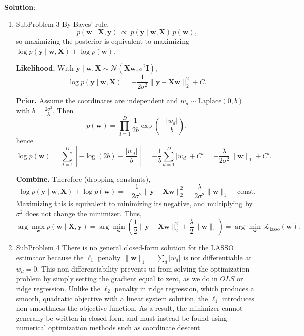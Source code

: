 \documentclass[submit]{harvardml}
\newenvironment{solution}{
    \vspace{2mm}
    \color{blue}\noindent\textbf{Solution}:
}{}
\begin{document}
\begin{solution}
\begin{enumerate}
Rearrange:

\[
(\mathbf X^\top \mathbf X + \lambda \mathbf I)\mathbf w
=
\mathbf X^\top \mathbf y.
\]

Assuming $(\mathbf X^\top \mathbf X + \lambda \mathbf I)$ is invertible, we obtain

\[
\boxed{
\mathbf w_{\text{ridge}}
=
(\mathbf X^\top \mathbf X + \lambda \mathbf I)^{-1}
\mathbf X^\top \mathbf y.
}
\]

\item SubProblem 3 
By Bayes' rule,
\[
p(\mathbf w\mid \mathbf X,\mathbf y)\ \propto\ p(\mathbf y\mid \mathbf w,\mathbf X)\,p(\mathbf w),
\]
so maximizing the posterior is equivalent to maximizing
$\log p(\mathbf y\mid \mathbf w,\mathbf X)+\log p(\mathbf w)$.

\textbf{Likelihood.}
With $\mathbf y\mid \mathbf w,\mathbf X \sim \mathcal N(\mathbf X\mathbf w,\sigma^2\mathbf I)$,
\[
\log p(\mathbf y\mid \mathbf w,\mathbf X)
=
-\frac{1}{2\sigma^2}\|\mathbf y-\mathbf X\mathbf w\|_2^2 + C.
\]

\textbf{Prior.}
Assume the coordinates are independent and $w_d \sim \mathrm{Laplace}(0,b)$ with
$b=\frac{2\sigma^2}{\lambda}$. Then
\[
p(\mathbf w)=\prod_{d=1}^D \frac{1}{2b}\exp\!\left(-\frac{|w_d|}{b}\right),
\]
hence
\[
\log p(\mathbf w)
=
\sum_{d=1}^D\left[-\log(2b)-\frac{|w_d|}{b}\right]
=
-\frac{1}{b}\sum_{d=1}^D |w_d| + C'
=
-\frac{\lambda}{2\sigma^2}\|\mathbf w\|_1 + C'.
\]

\textbf{Combine.}
Therefore (dropping constants),
\[
\log p(\mathbf y\mid \mathbf w,\mathbf X)+\log p(\mathbf w)
=
-\frac{1}{2\sigma^2}\|\mathbf y-\mathbf X\mathbf w\|_2^2
-\frac{\lambda}{2\sigma^2}\|\mathbf w\|_1
+\text{const}.
\]
Maximizing this is equivalent to minimizing its negative, and multiplying by $\sigma^2$ does not
change the minimizer. Thus,
\[
\arg\max_{\mathbf w} p(\mathbf w\mid \mathbf X,\mathbf y)
=
\arg\min_{\mathbf w}\left(
\frac{1}{2}\|\mathbf y-\mathbf X\mathbf w\|_2^2
+\frac{\lambda}{2}\|\mathbf w\|_1
\right)
=
\arg\min_{\mathbf w}\ \mathcal L_{\text{lasso}}(\mathbf w).
\]

\item SubProblem 4
There is no general closed-form solution for the LASSO estimator because the
$\ell_1$ penalty $\|\mathbf w\|_1 = \sum_d |w_d|$ is not differentiable at $w_d = 0$.
This non-differentiability prevents us from solving the optimization problem by simply setting the gradient equal to zero, as we do in $OLS$ or ridge regression. Unlike the $\ell_2$ penalty in ridge regression, which produces a smooth, quadratic objective with a linear system solution, the $\ell_1$ introduces non-smoothness the objective function. As a result, the minimizer cannot generally be
written in closed form and must instead be found using numerical optimization
methods such as coordinate descent.


\end{enumerate}
\end{solution}
\end{document}
